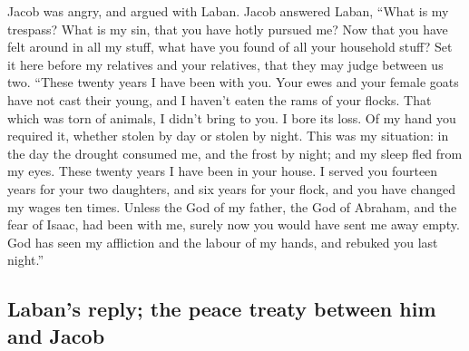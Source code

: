  Jacob was angry, and argued with Laban. Jacob answered
Laban, ``What is my trespass? What is my sin, that you have hotly
pursued me?  Now that you have felt around in all my
stuff, what have you found of all your household stuff? Set it here
before my relatives and your relatives, that they may judge between us
two.  ``These twenty years I have been with you. Your
ewes and your female goats have not cast their young, and I haven't
eaten the rams of your flocks.  That which was torn of
animals, I didn't bring to you. I bore its loss. Of my hand you required
it, whether stolen by day or stolen by night.  This was
my situation: in the day the drought consumed me, and the frost by
night; and my sleep fled from my eyes.  These twenty
years I have been in your house. I served you fourteen years for your
two daughters, and six years for your flock, and you have changed my
wages ten times.  Unless the God of my father, the God of
Abraham, and the fear of Isaac, had been with me, surely now you would
have sent me away empty. God has seen my affliction and the labour of my
hands, and rebuked you last night.''

\hypertarget{labans-reply-the-peace-treaty-between-him-and-jacob}{%
\subsection{Laban's reply; the peace treaty between him and
Jacob}\label{labans-reply-the-peace-treaty-between-him-and-jacob}}

